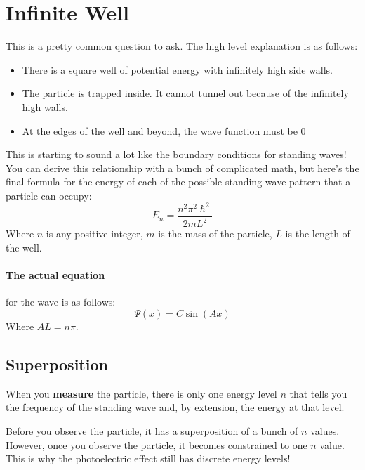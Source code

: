 \documentclass[a4paper,12pt]{report}
\begin{document}
\section{Infinite Well}
This is a pretty common question to ask. The high level explanation is as follows:
\begin{itemize}
\item There is a square well of potential energy with infinitely high side walls.
\item The particle is trapped inside. It cannot tunnel out because of the infinitely high walls.
\item At the edges of the well and beyond, the wave function must be 0
\end{itemize}
This is starting to sound a lot like the boundary conditions for standing waves! You can derive this relationship with a bunch
of complicated math, but here's the final formula for the energy of each of the possible standing wave pattern that a particle 
can occupy: 
$$E_n = \frac{n^2\pi^2\hslash^2}{2mL^2}$$
Where $n$ is any positive integer, $m$ is the mass of the particle, $L$ is the length of the well. 

\paragraph{The actual equation} for the wave is as follows: $$\Psi(x) = C\sin(Ax)$$
Where $AL = n\pi$.

\subsection{Superposition}
When you \textbf{measure} the particle, there is only one energy level $n$ that tells you the frequency of the standing wave and, by extension, 
the energy at that level.

Before you observe the particle, it has a superposition of a bunch of $n$ values. However, once you observe the particle, it becomes constrained 
to one $n$ value. This is why the photoelectric effect still has discrete energy levels!
\end{document}
